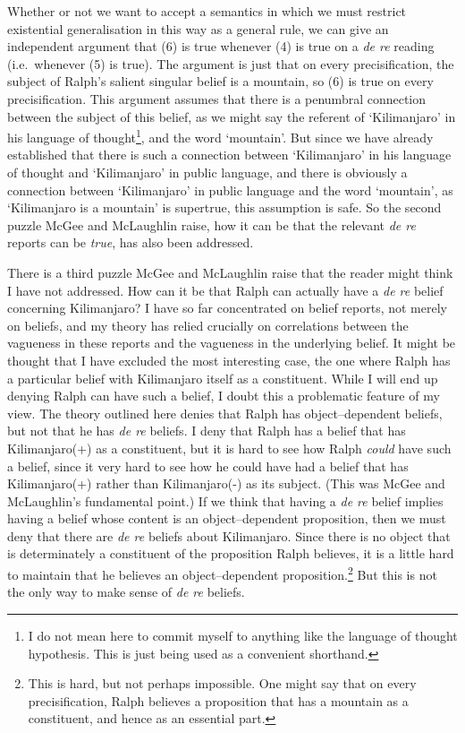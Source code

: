 \documentclass[
  10pt,
  letterpaper,
  DIV=11,
  numbers=noendperiod,
  twoside]{scrartcl}
\begin{document}
Whether or not we want to accept a semantics in which we must restrict
existential generalisation in this way as a general rule, we can give an
independent argument that (6) is true whenever (4) is true on a \emph{de
re} reading (i.e.~whenever (5) is true). The argument is just that on
every precisification, the subject of Ralph's salient singular belief is
a mountain, so (6) is true on every precisification. This argument
assumes that there is a penumbral connection between the subject of this
belief, as we might say the referent of `Kilimanjaro' in his language of
thought\footnote{I do not mean here to commit myself to anything like
  the language of thought hypothesis. This is just being used as a
  convenient shorthand.}, and the word `mountain'. But since we have
already established that there is such a connection between
`Kilimanjaro' in his language of thought and `Kilimanjaro' in public
language, and there is obviously a connection between `Kilimanjaro' in
public language and the word `mountain', as `Kilimanjaro is a mountain'
is supertrue, this assumption is safe. So the second puzzle McGee and
McLaughlin raise, how it can be that the relevant \emph{de re} reports
can be \emph{true}, has also been addressed.

There is a third puzzle McGee and McLaughlin raise that the reader might
think I have not addressed. How can it be that Ralph can actually have a
\emph{de re} belief concerning Kilimanjaro? I have so far concentrated
on belief reports, not merely on beliefs, and my theory has relied
crucially on correlations between the vagueness in these reports and the
vagueness in the underlying belief. It might be thought that I have
excluded the most interesting case, the one where Ralph has a particular
belief with Kilimanjaro itself as a constituent. While I will end up
denying Ralph can have such a belief, I doubt this a problematic feature
of my view. The theory outlined here denies that Ralph has
object--dependent beliefs, but not that he has \emph{de re} beliefs. I
deny that Ralph has a belief that has Kilimanjaro(+) as a constituent,
but it is hard to see how Ralph \emph{could} have such a belief, since
it very hard to see how he could have had a belief that has
Kilimanjaro(+) rather than Kilimanjaro(-) as its subject. (This was
McGee and McLaughlin's fundamental point.) If we think that having a
\emph{de re} belief implies having a belief whose content is an
object--dependent proposition, then we must deny that there are \emph{de
re} beliefs about Kilimanjaro. Since there is no object that is
determinately a constituent of the proposition Ralph believes, it is a
little hard to maintain that he believes an object--dependent
proposition.\footnote{This is hard, but not perhaps impossible. One
  might say that on every precisification, Ralph believes a proposition
  that has a mountain as a constituent, and hence as an essential part.}
But this is not the only way to make sense of \emph{de re} beliefs.
\end{document}
